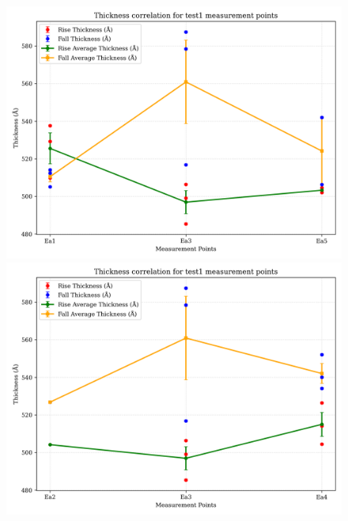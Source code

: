 \documentclass[platex,dvipdfmx,10pt,twoside,a4paper,jis2004]{jsarticle}
\begin{document}
\begin{figure}[H]
    \centering
    \begin{minipage}[t]{0.48\textwidth}
        \centering
        \includegraphics[width=\linewidth]{thickness_correlation_test1_Ea1-3-5.png}
    \end{minipage}
    \hfill
    \begin{minipage}[t]{0.48\textwidth}
        \centering
        \includegraphics[width=\linewidth]{thickness_correlation_test1_Ea2-3-4.png}
    \end{minipage}
    \label{fig:test1_ea_correlations}
\end{figure}
\end{document}
